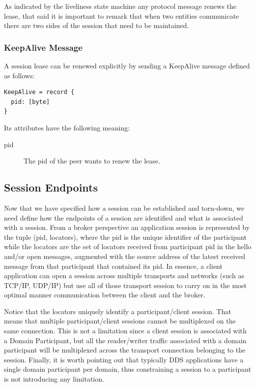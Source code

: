 \documentclass[a4paper,oneside,article]{memoir}
\begin{document}
As indicated by the liveliness state machine any protocol message renews the lease, that said it is
important to remark that when two entities communicate there are two sides of the session that need
to be maintained.

\subsubsection{KeepAlive Message}
A session lease can be renewed explicitly by sending a KeepAlive message defined as follows:
\begin{verbatim}
KeepAlive = record {
  pid: [byte]
}
\end{verbatim}
Its attributes have the following meaning:
\begin{description}
\item[pid] The pid of the peer wants to renew the lease.
\end{description}


\subsection{Session Endpoints}

Now that we have specified how a session can be established and torn-down, we need define how the
endpoints of a session are identified and what is associated with a session.  From a broker
perspective an application session is represented by the tuple (pid, locators), where the pid is the
unique identifier of the participant while the locators are the set of locators received from
participant pid in the hello and/or open messages, augmented with the source address of the latest
received message from that participant that contained its pid.  In essence, a client application can
open a session across multiple transports and networks (such as TCP/IP, UDP/IP) but use all of those
transport session to carry on in the most optimal manner communication between the client and the
broker.

Notice that the locators uniquely identify a participant/client session.  That means that multiple
participant/client sessions cannot be multiplexed on the same connection.  This is not a limitation
since a client session is associated with a Domain Participant, but all the reader/writer traffic
associated with a domain participant will be multiplexed across the transport connection belonging
to the session.  Finally, it is worth pointing out that typically DDS applications have a single
domain participant per domain, thus constraining a session to a participant is not introducing any
limitation.
\end{document}
